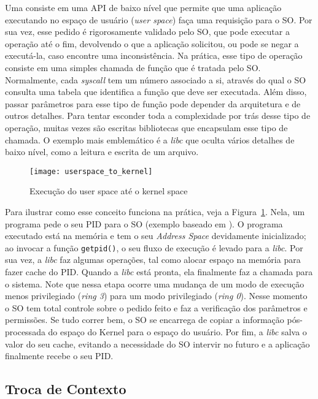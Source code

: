 Uma 
consiste em uma API de baixo nível que permite que uma aplicação executando no
espaço de usuário (\emph{user space}) faça uma requisição  para o
SO. Por sua vez, esse pedido é rigorosamente validado pelo SO, que pode
executar a operação até o fim, devolvendo o que a aplicação solicitou, ou pode
se negar a executá-la, caso encontre uma inconsistência. Na prática, esse tipo de operação
consiste em uma simples chamada de função que é tratada pelo SO. Normalmente,
cada \emph{syscall} tem um número associado a si, através do qual o SO consulta uma
tabela que identifica a função que deve ser executada. Além disso, passar
parâmetros para esse tipo de função pode depender da arquitetura e de outros
detalhes. Para tentar esconder toda a complexidade por trás desse tipo de
operação, muitas vezes são escritas bibliotecas que encapsulam esse tipo de
chamada. O exemplo mais emblemático é a \emph{libc} que oculta vários detalhes
de baixo nível, como a leitura e escrita de um arquivo.

\begin{figure}[!h]
  \centering
  \texttt{[image: userspace\_to\_kernel]} 
  \caption{Execução do user space até o kernel space}
  \label{fig:userspace_kernelspace}
\end{figure}

Para ilustrar como esse conceito funciona na prática, veja a
Figura~\ref{fig:userspace_kernelspace}. Nela, um programa pede o
seu PID para o SO (exemplo baseado em \cite{syscallex}). O programa executado
está na memória e tem o seu \emph{Address Space} devidamente inicializado;
ao invocar a função \texttt{getpid()}, o seu fluxo de execução é levado para a
\emph{libc}. Por sua vez, a \emph{libc} faz algumas operações, tal como alocar
espaço na memória para fazer cache do PID. Quando a \emph{libc} está pronta,
ela finalmente faz a chamada para o sistema. Note que nessa etapa ocorre uma
mudança de um modo de execução menos privilegiado (\emph{ring 3}) para um modo
privilegiado (\emph{ring 0}). Nesse momento o SO tem total controle sobre o
pedido feito e faz a verificação dos parâmetros e permissões. Se tudo correr
bem, o SO se encarrega de copiar a informação pós-processada do espaço do
Kernel para o espaço do usuário. Por fim, a \emph{libc} salva o valor do seu
cache, evitando a necessidade do SO intervir no futuro e a aplicação finalmente
recebe o seu PID.

\subsection{Troca de Contexto}

